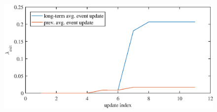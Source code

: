 \begin{figure}[htbp]
    \centering
    \includegraphics[scale=1]{chapters/mapping_of_dynamic_areas/figures/visualization_of_advantage_long_term_average}
    \caption{}
    \label{fig:visualization_of_advantage_long_term_average}
\end{figure}
